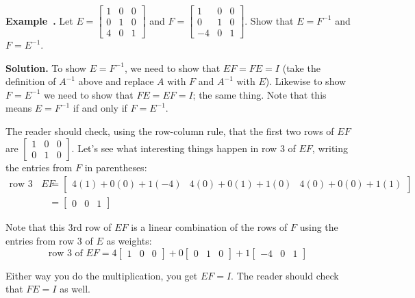 \documentclass[11pt, letterpaper]{report}
\newenvironment{notes}{}{}
\newenvironment{book}{}{}
\newcounter{example}[section]
\newcommand{\example}{\refstepcounter{example}%
\par\noindent\textbf{Example~\theexample.} }
\begin{document}
\example {} \label{example:2.3-first-elementary} Let $E = \begin{bmatrix}
1 & 0 & 0 \\
0 & 1 & 0 \\
4 & 0 & 1
\end{bmatrix}$ and $F = \begin{bmatrix}
1 & 0 & 0 \\
0 & 1 & 0 \\
-4 & 0 & 1
\end{bmatrix}$. Show that $E = F^{-1}$ and $F = E^{-1}$.

\begin{notes}
\vfill 
\newpage
\end{notes}

\begin{book}
\textbf{Solution.} To show $E = F^{-1}$, we need to show that $EF = FE = I$ (take the definition of $A^{-1}$ above and replace $A$ with $F$ and $A^{-1}$ with $E$). Likewise to show $F = E^{-1}$  we need to show that $FE = EF = I$; the same thing. Note that this means $E = F^{-1}$ if and only if $F = E^{-1}$.

The reader should check, using the row-column rule, that the first two rows of $EF$ are $\begin{bmatrix}
1 & 0 & 0 \\
0 & 1 & 0
\end{bmatrix}$. Let's see what interesting things happen in row 3 of $EF$, writing the entries from $F$ in parentheses:
\begin{align*}
\text{row 3 of } EF &= \begin{bmatrix}
4(1) + 0(0) + 1(-4) & 4(0) + 0(1) + 1(0) & 4(0) + 0(0) + 1(1)
\end{bmatrix} \\
&= \begin{bmatrix}
0 & 0 & 1
\end{bmatrix}
\end{align*}

Note that this 3rd row of $EF$ is a linear combination of the rows of $F$ using the entries from row 3 of $E$ as weights:
\[\text{row 3 of } EF = 4\begin{bmatrix}
1 & 0 & 0
\end{bmatrix} + 0\begin{bmatrix}
0 & 1 & 0
\end{bmatrix} + 1\begin{bmatrix}
-4 & 0 & 1
\end{bmatrix} \]

Either way you do the multiplication, you get $EF = I$. The reader should check that $FE = I$ as well. \blacksquare
\end{book}
\end{document}
